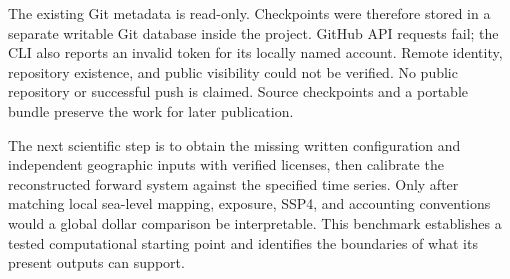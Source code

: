 \documentclass[11pt]{article}
\begin{document}
The existing Git metadata is read-only. Checkpoints were therefore stored in
a separate writable Git database inside the project. GitHub API requests fail;
the CLI also reports an invalid token for its locally named account. Remote
identity, repository existence, and public visibility could not be verified.
No public repository or successful push is claimed. Source checkpoints and a
portable bundle preserve the work for later publication.

The next scientific step is to obtain the missing written configuration and
independent geographic inputs with verified licenses, then calibrate the
reconstructed forward system against the specified time series. Only after
matching local sea-level mapping, exposure, SSP4, and accounting conventions
would a global dollar comparison be interpretable. This benchmark establishes
a tested computational starting point and identifies the boundaries of what
its present outputs can support.
\end{document}

